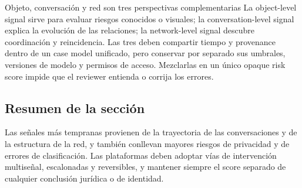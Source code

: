 \begin{importantbox}{Objeto, conversación y red son tres perspectivas complementarias}
La object-level signal sirve para evaluar riesgos conocidos o visuales; la conversation-level signal explica la evolución de las relaciones; la network-level signal descubre coordinación y reincidencia. Las tres deben compartir tiempo y provenance dentro de un case model unificado, pero conservar por separado sus umbrales, versiones de modelo y permisos de acceso. Mezclarlas en un único opaque risk score impide que el reviewer entienda o corrija los errores.
\end{importantbox}

\subsection{Resumen de la sección}

Las señales más tempranas provienen de la trayectoria de las conversaciones y de la estructura de la red, y también conllevan mayores riesgos de privacidad y de errores de clasificación. Las plataformas deben adoptar vías de intervención multiseñal, escalonadas y reversibles, y mantener siempre el score separado de cualquier conclusión jurídica o de identidad.
